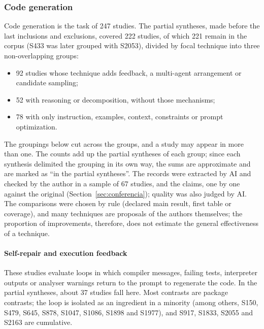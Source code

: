 \subsubsection{Code generation}

Code generation is the task of 247 studies. The partial syntheses, made before the last inclusions and exclusions,
covered 222 studies, of which 221 remain in the corpus (S433 was later grouped with S2053), divided by focal technique into three non-overlapping groups:
\begin{itemize}
\item 92 studies whose technique adds feedback, a multi-agent arrangement or candidate sampling;
\item 52 with reasoning or decomposition, without those mechanisms;
\item 78 with only instruction, examples, context, constraints or prompt optimization.
\end{itemize}

The groupings below cut across the groups, and a study may appear in more than one. The counts add up the partial syntheses of each group; since each synthesis delimited the grouping in its own way, the sums are approximate and are marked as ``in the partial syntheses''. The records were extracted by AI and checked by the author in a sample of 67 studies, and the claims, one by one against the original (Section~\ref{sec:conferencia}); quality was also judged by AI. The comparisons were chosen by rule (declared main result, first table or coverage), and many techniques are proposals of the authors themselves; the proportion of improvements, therefore, does not estimate the general effectiveness of a technique.

\paragraph{Self-repair and execution feedback}
These studies evaluate loops in which compiler messages, failing tests, interpreter outputs or analyser warnings return to the prompt to regenerate the code. In the partial syntheses, about 37 studies fall here. Most contrasts are package contrasts; the loop is isolated as an ingredient in a minority (among others, S150, S479, S645, S878, S1047, S1086, S1898 and S1977), and S917, S1833, S2055 and S2163 are cumulative.

